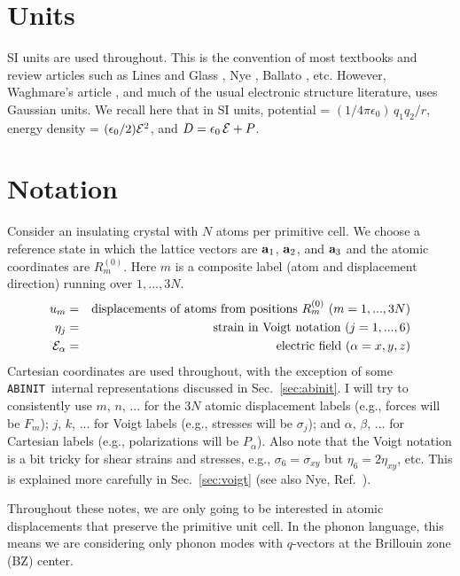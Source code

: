 \documentclass[11pt,fleqn]{article}
\def\bea{\begin{eqnarray}}
\def\eea{\end{eqnarray}}
\def\E{{\cal E}}
\def\eps{\epsilon}
\def\epso{\eps_0}
\def\ABINIT{{{\tt ABINIT}}}
\begin{document}
\section{Units}

SI units are used throughout.  This is the convention of most
textbooks and review articles such as Lines and Glass \cite{lines},
Nye \cite{nye}, Ballato \cite{ballato}, etc.  However, Waghmare's
article \cite{waghmare}, and much of the usual electronic
structure literature, uses Gaussian units.  We recall here that in
SI units, potential = $(1/4\pi\epso)\,q_1q_2/r$, energy density =
$(\epso/2)\E^2$, and $D=\epso\,\E+P$.

\section{Notation}
\label{sec:notation}

Consider an insulating crystal with $N$ atoms per primitive cell.
We choose a reference state in which the lattice vectors are
${\bf a}_1$, ${\bf a}_2$, and ${\bf a}_3$ and the atomic coordinates
are $R_m^{(0)}$.  Here $m$ is a composite label (atom and displacement
direction) running over $1,...,3N$.
%
\bea
u_m &=& \hbox{displacements of atoms from positions $R_m^{(0)}$
                 ($m=1,...,3N$)}
\nonumber\\
\eta_j &=& \hbox{strain in Voigt notation ($j=1,...,6$)}
\nonumber\\
\E_\alpha &=& \hbox{electric field ($\alpha=x,y,z$)}
\eea
%
Cartesian coordinates are used throughout, with the exception of
some \ABINIT\ internal representations discussed in
Sec.~\ref{sec:abinit}.  I will try to
consistently use $m$, $n$, ... for the $3N$ atomic displacement labels
(e.g., forces will be $F_m$); $j$, $k$, ... for Voigt labels (e.g.,
stresses will be $\sigma_j$); and $\alpha$, $\beta$, ... for
Cartesian labels (e.g., polarizations will be $P_\alpha$).  Also
note that the Voigt notation is a bit tricky for shear strains and
stresses, e.g.,  $\sigma_6=\sigma_{xy}$ but $\eta_6=2\eta_{xy}$,
etc.  This is explained more carefully in Sec.~\ref{sec:voigt}
(see also Nye, Ref.~\cite{nye}).

Throughout these notes, we are only going to be interested in
atomic displacements that preserve the primitive unit cell.  In the
phonon language, this means we are considering only phonon modes
with $q$-vectors at the Brillouin zone (BZ) center.
\end{document}
